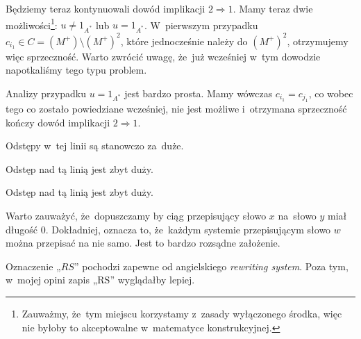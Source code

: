 \documentclass[a4paper,11pt]{article}
\begin{document}
Będziemy teraz kontynuowali dowód implikacji $2 \Rightarrow 1$. Mamy teraz dwie
możliwości\footnote{Zauważmy, że~tym miejscu korzystamy z~zasady
  wyłączonego środka, więc nie byłoby to akceptowalne w~matematyce
  konstrukcyjnej.}: $u \neq 1_{ A^{ * } }$ lub $u = 1_{ A^{ * } }$. W~pierwszym
przypadku $c_{ i_{ 1 } } \in C = ( M^{ + } ) \setminus ( M^{ + } )^{ 2 }$, które
jednocześnie należy do $( M^{ + } )^{ 2 }$, otrzymujemy więc sprzeczność.
Warto zwrócić uwagę, że~już wcześniej w~tym dowodzie napotkaliśmy tego typu
problem.

Analizy przypadku $u = 1_{ A^{ * } }$ jest bardzo prosta. Mamy wówczas
$c_{ i _{ 1 } } = c_{ j_{ 1 } }$, co wobec tego co zostało powiedziane
wcześniej, nie jest możliwe i~otrzymana sprzeczność kończy dowód implikacji
$2 \Rightarrow 1$.

\vspace{\spaceFour}





\start {} Odstępy w~tej linii są stanowczo za~duże.

\vspace{\spaceFour}





\start {} Odstęp nad tą linią jest zbyt duży.

\vspace{\spaceFour}





\start {} Odstęp nad tą linią jest zbyt duży.

\vspace{\spaceFour}





\start {} Warto zauważyć, że~dopuszczamy by ciąg przepisujący słowo
$x$ na~słowo $y$ miał długość 0. Dokładniej, oznacza to, że~każdym systemie
przepisującym słowo $w$ można przepisać na nie samo. Jest to bardzo rozsądne
założenie.

\vspace{\spaceFour}





\start {} Oznaczenie „$RS$” pochodzi zapewne od angielskiego
\textit{rewriting system}. Poza tym, w~mojej opini zapis „$\textrm{RS}$”
wyglądałby lepiej.

\vspace{\spaceFour}
\end{document}
